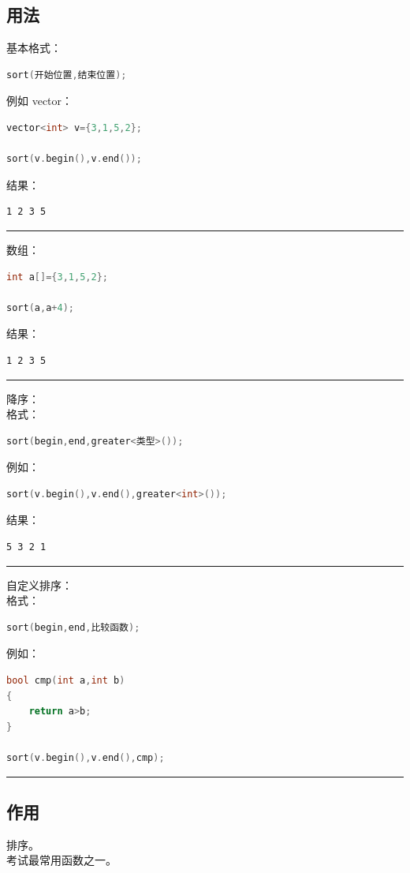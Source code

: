 \documentclass[10pt,twocolumn]{extarticle}
\begin{document}
\subsection{用法}
基本格式：
\begin{lstlisting}[language=C++]
sort(开始位置,结束位置);
\end{lstlisting}
例如 vector：
\begin{lstlisting}[language=C++]
vector<int> v={3,1,5,2};

sort(v.begin(),v.end());
\end{lstlisting}
结果：
\begin{lstlisting}
1 2 3 5
\end{lstlisting}

\noindent\rule{\linewidth}{0.4pt}

数组：
\begin{lstlisting}[language=C++]
int a[]={3,1,5,2};

sort(a,a+4);
\end{lstlisting}
结果：
\begin{lstlisting}
1 2 3 5
\end{lstlisting}

\noindent\rule{\linewidth}{0.4pt}

降序：\\
格式：
\begin{lstlisting}[language=C++]
sort(begin,end,greater<类型>());
\end{lstlisting}
例如：
\begin{lstlisting}[language=C++]
sort(v.begin(),v.end(),greater<int>());
\end{lstlisting}
结果：
\begin{lstlisting}
5 3 2 1
\end{lstlisting}

\noindent\rule{\linewidth}{0.4pt}

自定义排序：\\
格式：
\begin{lstlisting}[language=C++]
sort(begin,end,比较函数);
\end{lstlisting}
例如：
\begin{lstlisting}[language=C++]
bool cmp(int a,int b)
{
    return a>b;
}

sort(v.begin(),v.end(),cmp);
\end{lstlisting}

\noindent\rule{\linewidth}{0.4pt}

\subsection{作用}
排序。\\
考试最常用函数之一。
\end{document}
